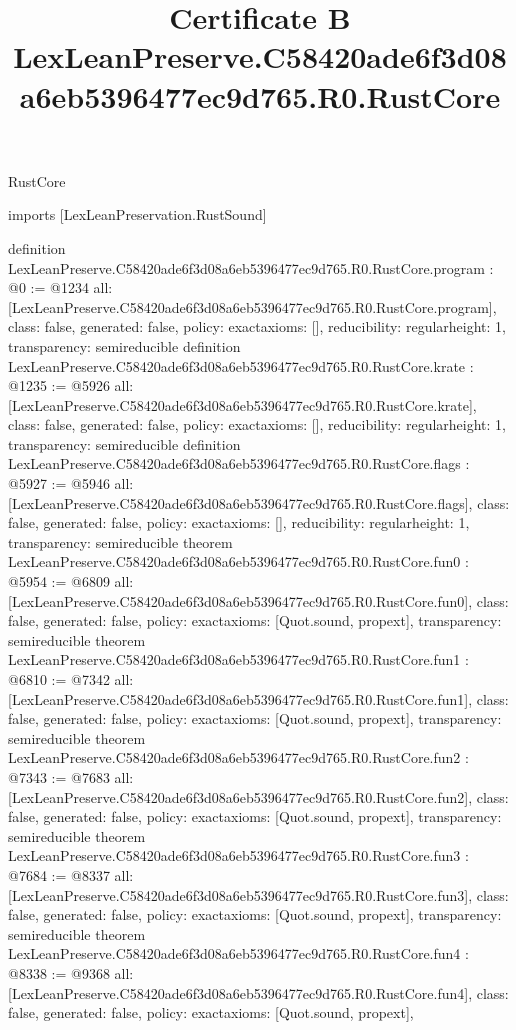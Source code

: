 \begin{lexlean}{RustCore}
\title{Certificate B LexLeanPreserve.C58420ade6f3d08a6eb5396477ec9d765.R0.RustCore}
\begin{coremodule}
imports [LexLeanPreservation.RustSound]

definition LexLeanPreserve.C58420ade6f3d08a6eb5396477ec9d765.R0.RustCore.program : @0 := @1234 {
  all: [LexLeanPreserve.C58420ade6f3d08a6eb5396477ec9d765.R0.RustCore.program],
  class: false,
  generated: false,
  policy: exact{axioms: []},
  reducibility: regular{height: 1},
  transparency: semireducible
}
definition LexLeanPreserve.C58420ade6f3d08a6eb5396477ec9d765.R0.RustCore.krate : @1235 := @5926 {
  all: [LexLeanPreserve.C58420ade6f3d08a6eb5396477ec9d765.R0.RustCore.krate],
  class: false,
  generated: false,
  policy: exact{axioms: []},
  reducibility: regular{height: 1},
  transparency: semireducible
}
definition LexLeanPreserve.C58420ade6f3d08a6eb5396477ec9d765.R0.RustCore.flags : @5927 := @5946 {
  all: [LexLeanPreserve.C58420ade6f3d08a6eb5396477ec9d765.R0.RustCore.flags],
  class: false,
  generated: false,
  policy: exact{axioms: []},
  reducibility: regular{height: 1},
  transparency: semireducible
}
theorem LexLeanPreserve.C58420ade6f3d08a6eb5396477ec9d765.R0.RustCore.fun0 : @5954 := @6809 {
  all: [LexLeanPreserve.C58420ade6f3d08a6eb5396477ec9d765.R0.RustCore.fun0],
  class: false,
  generated: false,
  policy: exact{axioms: [Quot.sound, propext]},
  transparency: semireducible
}
theorem LexLeanPreserve.C58420ade6f3d08a6eb5396477ec9d765.R0.RustCore.fun1 : @6810 := @7342 {
  all: [LexLeanPreserve.C58420ade6f3d08a6eb5396477ec9d765.R0.RustCore.fun1],
  class: false,
  generated: false,
  policy: exact{axioms: [Quot.sound, propext]},
  transparency: semireducible
}
theorem LexLeanPreserve.C58420ade6f3d08a6eb5396477ec9d765.R0.RustCore.fun2 : @7343 := @7683 {
  all: [LexLeanPreserve.C58420ade6f3d08a6eb5396477ec9d765.R0.RustCore.fun2],
  class: false,
  generated: false,
  policy: exact{axioms: [Quot.sound, propext]},
  transparency: semireducible
}
theorem LexLeanPreserve.C58420ade6f3d08a6eb5396477ec9d765.R0.RustCore.fun3 : @7684 := @8337 {
  all: [LexLeanPreserve.C58420ade6f3d08a6eb5396477ec9d765.R0.RustCore.fun3],
  class: false,
  generated: false,
  policy: exact{axioms: [Quot.sound, propext]},
  transparency: semireducible
}
theorem LexLeanPreserve.C58420ade6f3d08a6eb5396477ec9d765.R0.RustCore.fun4 : @8338 := @9368 {
  all: [LexLeanPreserve.C58420ade6f3d08a6eb5396477ec9d765.R0.RustCore.fun4],
  class: false,
  generated: false,
  policy: exact{axioms: [Quot.sound, propext]},
}
\end{coremodule}
\end{lexlean}

